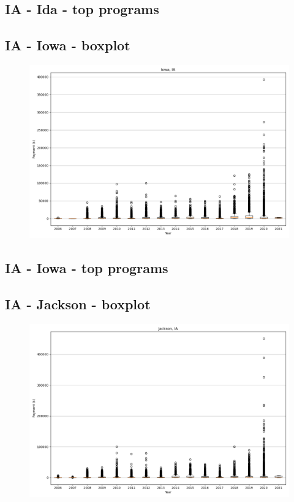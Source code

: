 \subsection*{IA - Ida - top programs}

\newpage
\subsection*{IA - Iowa - boxplot}
\begin{figure}[h]
\centering
\includegraphics[width=7in]{../output/boxplots/counties/Iowa-IA_boxplot.png}
\end{figure}


\subsection*{IA - Iowa - top programs}

\newpage
\subsection*{IA - Jackson - boxplot}
\begin{figure}[h]
\centering
\includegraphics[width=7in]{../output/boxplots/counties/Jackson-IA_boxplot.png}
\end{figure}


